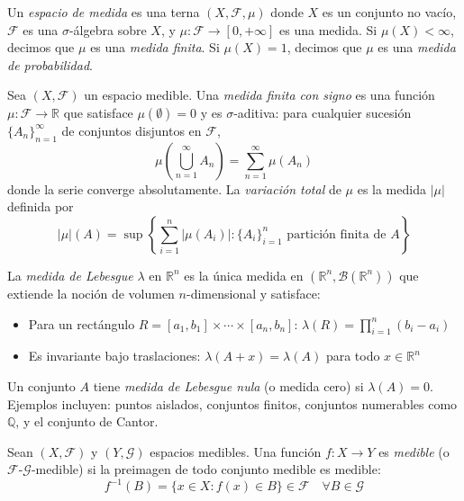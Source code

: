 \begin{definition}\label{def:espacio_medida}
	Un \textit{espacio de medida} es una terna $(X, \mathcal{F}, \mu)$ donde $X$ es un conjunto no vacío, $\mathcal{F}$ es una $\sigma$-álgebra sobre $X$, y $\mu: \mathcal{F} \to [0, +\infty]$ es una medida. Si $\mu(X) < \infty$, decimos que $\mu$ es una \textit{medida finita}. Si $\mu(X) = 1$, decimos que $\mu$ es una \textit{medida de probabilidad}.
\end{definition}

\begin{definition}\label{def:medida_con_signo}
	Sea $(X, \mathcal{F})$ un espacio medible. Una \textit{medida finita con signo} es una función $\mu: \mathcal{F} \to \mathbb{R}$ que satisface $\mu(\emptyset) = 0$ y es $\sigma$-aditiva: para cualquier sucesión $\{A_n\}_{n=1}^\infty$ de conjuntos disjuntos en $\mathcal{F}$,
	\[
		\mu\left(\bigcup_{n=1}^\infty A_n\right) = \sum_{n=1}^\infty \mu(A_n)
	\]
	donde la serie converge absolutamente. La \textit{variación total} de $\mu$ es la medida $|\mu|$ definida por
	\[
		|\mu|(A) = \sup \left\{ \sum_{i=1}^n |\mu(A_i)| : \{A_i\}_{i=1}^n \text{ partición finita de } A \right\}
	\]
\end{definition}

\begin{definition}\label{def:medida_lebesgue}
	La \textit{medida de Lebesgue} $\lambda$ en $\mathbb{R}^n$ es la única medida en $(\mathbb{R}^n, \mathcal{B}(\mathbb{R}^n))$ que extiende la noción de volumen $n$-dimensional y satisface:
	\begin{itemize}
		\item Para un rectángulo $R = [a_1, b_1] \times \cdots \times [a_n, b_n]$: $\lambda(R) = \prod_{i=1}^n (b_i - a_i)$
		\item Es invariante bajo traslaciones: $\lambda(A + x) = \lambda(A)$ para todo $x \in \mathbb{R}^n$
	\end{itemize}
\end{definition}

Un conjunto $A$ tiene \textit{medida de Lebesgue nula} (o medida cero) si $\lambda(A) = 0$. Ejemplos incluyen: puntos aislados, conjuntos finitos, conjuntos numerables como $\mathbb{Q}$, y el conjunto de Cantor.

\begin{definition}\label{def:funcion_medible}
	Sean $(X, \mathcal{F})$ y $(Y, \mathcal{G})$ espacios medibles. Una función $f: X \to Y$ es \textit{medible} (o $\mathcal{F}$-$\mathcal{G}$-medible) si la preimagen de todo conjunto medible es medible:
	\[
		f^{-1}(B) = \{x \in X : f(x) \in B\} \in \mathcal{F} \quad \forall B \in \mathcal{G}
	\]
\end{definition}

